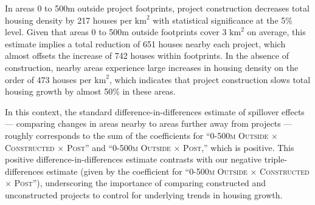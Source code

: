 \documentclass[12pt]{article}
\begin{document}
% 



In areas 0 to 500m outside project footprints, project construction decreases total housing density by 217 houses per $\text{km}^{2}$ with statistical significance at the 5\% level.  Given that areas 0 to 500m outside footprints cover 3 $\text{km}^{2}$ on average, this estimate implies a total reduction of 651 houses nearby each project, which almost offsets the increase of 742 houses within footprints.  In the absence of construction, nearby areas experience large increases in housing density on the order of 473 houses per $\text{km}^{2}$, which indicates that project construction slows total housing growth by almost 50\% in these areas.  


In this context, the standard difference-in-differences estimate of spillover effects --- comparing changes in areas nearby to areas further away from projects --- roughly corresponds to the sum of the coefficients for ``\textsc{0-500m Outside} $\times$ \textsc{Constructed} $\times$ \textsc{Post}'' and ``\textsc{0-500m Outside} $\times$ \textsc{Post},'' which is positive.  This positive difference-in-differences estimate contrasts with our negative triple-differences estimate (given by the coefficient for ``\textsc{0-500m Outside} $\times$ \textsc{Constructed} $\times$ \textsc{Post}''), underscoring the importance of comparing constructed and unconstructed projects to control for underlying trends in housing growth.
\end{document}
